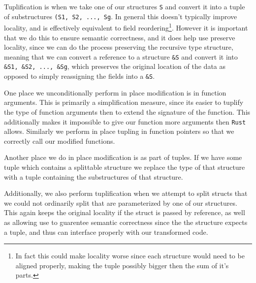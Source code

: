 \documentclass[12pt,oneside]{book}
\newcommand{\rustname}{{\texttt{Rust}}}
\def \rust {\rustname{}\xspace}
\begin{document}
Tuplification is when we take one of our structures \texttt{S} and convert it
into a tuple of substructures \texttt{(S1, S2, ..., Sg}. In general this 
doesn't typically improve locality, and is effectively equivalent to 
field reordering\footnote{In fact this could make locality worse since each
structure would need to be aligned properly, making the tuple possibly
bigger then the sum of it's parts.}. However it is important that we do this to
ensure semantic correctness, and it does help use preserve locality, since we can
do the process preserving the recursive type structure, meaning that
we can convert a reference to a structure \texttt{\&S} and convert it into 
\texttt{\&S1, \&S2, ..., \&Sg}, which preserves the original location of the 
data as opposed to simply reassigning the fields into a \texttt{\&S}.

One place we unconditionally perform in place modification is in function
arguments. This is primarily a simplification measure, since its easier to
tuplify the type of function arguments then to extend the signature of the
function. This additionally makes it impossible to give our function more
arguments then \rust allows.
Similarly we perform in place tupling in function pointers so that we correctly
call our modified functions.

Another place we do in place modification is as part of tuples. If we have some
tuple which contains a splittable structure we replace the type of that
structure with a tuple containing the substructures of that structure.

Additionally, we also perform tuplification when we attempt to split
structs that we could not ordinarily split that are parameterized by
one of our structures. This again keeps the original locality if
the struct is passed by reference, as well as allowing use to guarentee
semantic correctness since the the structure expects a tuple, and thus
can interface properly with our transformed code.

  
\end{document}
